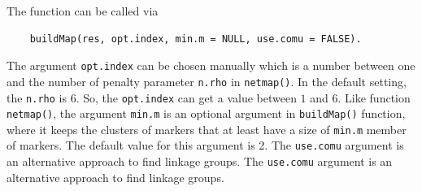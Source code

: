 The function can be called via
\begin{verbatim}
	buildMap(res, opt.index, min.m = NULL, use.comu = FALSE).
\end{verbatim}

The argument {\tt opt.index} can be chosen manually which is a number between one and the number of penalty parameter {\tt n.rho} in {\tt netmap()}. In the default setting, the {\tt n.rho} is $6$. So, the {\tt opt.index} can get a value between $1$ and $6$. Like function {\tt netmap()}, the argument {\tt min.m} is an optional argument in {\tt buildMap()} function, where it keeps the clusters of markers that at least have a size of {\tt min.m} member of markers. The default value for this argument is 2.
The {\tt use.comu} argument is an alternative approach to find linkage groups. %
The {\tt use.comu} argument is an alternative approach to find linkage groups. %

